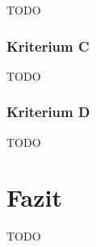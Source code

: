 \documentclass[11pt]{scrartcl}       %
\begin{document}
TODO



\subsubsection{Kriterium C}

 TODO



\subsubsection{Kriterium D}

 TODO



\section{Fazit}

 TODO



\newpage
{}
{}
\printbibliography
\end{document}
